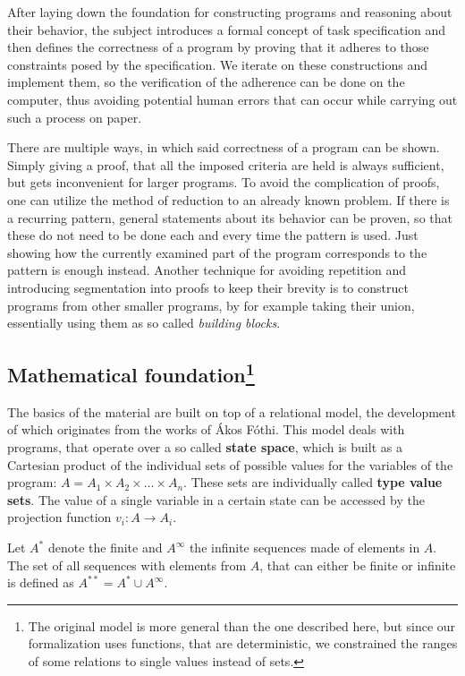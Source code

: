 After laying down the foundation for constructing programs and reasoning about their behavior, the subject introduces a formal concept of task specification and then defines the correctness of a program by proving that it adheres to those constraints posed by the specification. We iterate on these constructions and implement them, so the verification of the adherence can be done on the computer, thus avoiding potential human errors that can occur while carrying out such a process on paper.

There are multiple ways, in which said correctness of a program can be shown. Simply giving a proof, that all the imposed criteria are held is always sufficient, but gets inconvenient for larger programs. To avoid the complication of proofs, one can utilize the method of reduction to an already known problem. If there is a recurring pattern, general statements about its behavior can be proven, so that these do not need to be done each and every time the pattern is used. Just showing how the currently examined part of the program corresponds to the pattern is enough instead. Another technique for avoiding repetition and introducing segmentation into proofs to keep their brevity is to construct programs from other smaller programs, by for example taking their union, essentially using them as so called \textit{building blocks}.

\subsection[Mathematical foundation]{Mathematical foundation\protect\footnote{The original model is more general than the one described here, but since our formalization uses functions, that are deterministic, we constrained the ranges of some relations to single values instead of sets.}}

The basics of the material are built on top of a relational model, the development of which originates from the works of Ákos Fóthi\cite{fothi1988mathematical}. This model deals with programs, that operate over a so called \textbf{state space}, which is built as a Cartesian product of the individual sets of possible values for the variables of the program: $A = A_1 \times A_2 \times \ldots \times A_n$. These sets are individually called \textbf{type value sets}. The value of a single variable in a certain state can be accessed by the projection function $v_i : A \to A_i$.

Let $A^*$ denote the finite and $A^\infty$ the infinite sequences made of elements in $A$. The set of all sequences with elements from $A$, that can either be finite or infinite is defined as $A^{**} = A^* \cup A^\infty$.

